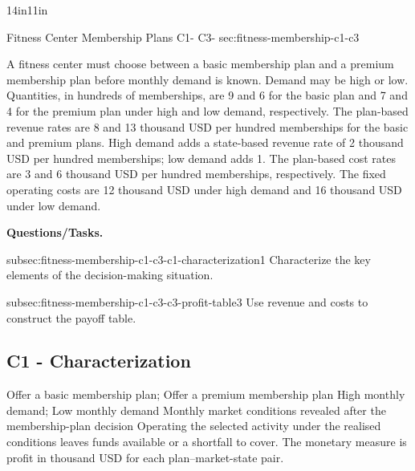 {\begin{CalculationLandscape}{14in}{11in}
		
		\begingroup\renewcommand{\CalculationStateCount}{2}
\endgroup
\end{CalculationLandscape}

		
		
	}

	\sectionScored
	{Fitness Center Membership Plans}
	{C1- \hspace{2mm} C3-}
	{sec:fitness-membership-c1-c3}
	{
		A fitness center must choose between a basic membership plan and a
		premium membership plan before monthly demand is known. Demand may be
		high or low. Quantities, in hundreds of memberships, are 9 and 6
		for the basic plan and 7 and 4 for the premium plan under high and
		low demand, respectively. The plan-based revenue rates are 8 and 13
		thousand USD per hundred memberships for the basic and premium
		plans. High demand adds a state-based revenue rate of 2 thousand USD
		per hundred memberships; low demand adds 1. The plan-based cost rates
		are 3 and 6 thousand USD per hundred memberships, respectively. The
		fixed operating costs are 12 thousand USD under high demand and
		16 thousand USD under low demand.
		
		\textbf{Questions/Tasks.}
		\begin{enumerate}
			\CriterionTask
			{subsec:fitness-membership-c1-c3-c1-characterization}{1}
			{Characterize the key elements of the decision-making situation. }
			
			\CriterionTask
			{subsec:fitness-membership-c1-c3-c3-profit-table}{3}
			{Use revenue and costs to construct the payoff table. }
		\end{enumerate}
		
		\label{subsec:fitness-membership-c1-c3-c1-characterization}
		\subsection*{C1 - Characterization }
		
		\DecisionElementsTable
{Offer a basic membership plan; Offer a premium membership plan}
{High monthly demand; Low monthly demand}
{Monthly market conditions revealed after the membership-plan decision}
{Operating the selected activity under the realised conditions leaves funds available or a shortfall to cover. The monetary measure is profit in thousand USD for each plan--market-state pair.}

}
